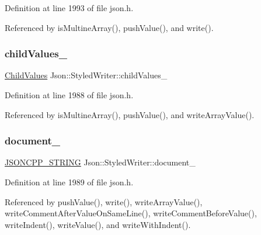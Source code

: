 Definition at line 1993 of file json.\+h.



Referenced by is\+Multine\+Array(), push\+Value(), and write().

\mbox{\label{class_json_1_1_styled_writer_a1f905495f0705365af117ec541e29fdf}} 
\subsubsection{\texorpdfstring{child\+Values\+\_\+}{childValues\_}}
{\footnotesize\ttfamily \hyperlink{class_json_1_1_styled_writer_a798fcefa41730de612a5cf7e73003e8a}{Child\+Values} Json\+::\+Styled\+Writer\+::child\+Values\+\_\+\hspace{0.3cm}{\ttfamily [private]}}



Definition at line 1988 of file json.\+h.



Referenced by is\+Multine\+Array(), push\+Value(), and write\+Array\+Value().

\mbox{\label{class_json_1_1_styled_writer_ae967b0c77e4d7cb889ce7b6ee4ce28d7}} 
\subsubsection{\texorpdfstring{document\+\_\+}{document\_}}
{\footnotesize\ttfamily \hyperlink{json_8h_a1e723f95759de062585bc4a8fd3fa4be}{J\+S\+O\+N\+C\+P\+P\+\_\+\+S\+T\+R\+I\+NG} Json\+::\+Styled\+Writer\+::document\+\_\+\hspace{0.3cm}{\ttfamily [private]}}



Definition at line 1989 of file json.\+h.



Referenced by push\+Value(), write(), write\+Array\+Value(), write\+Comment\+After\+Value\+On\+Same\+Line(), write\+Comment\+Before\+Value(), write\+Indent(), write\+Value(), and write\+With\+Indent().

